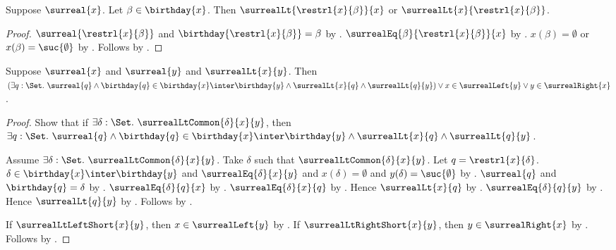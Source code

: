 \begin{theorem}\label{surreal_restriction_option}
    Suppose $\surreal{x}$.
    Let $\beta\in\birthday{x}$.
    Then $\surrealLt{\restrl{x}{\beta}}{x}$ or
        $\surrealLt{x}{\restrl{x}{\beta}}$.
\end{theorem}
\begin{proof}
    $\surreal{\restrl{x}{\beta}}$ and
        $\birthday{\restrl{x}{\beta}}=\beta$
        by .
    $\surrealEq{\beta}{\restrl{x}{\beta}}{x}$
        by .
    $x(\beta)=\emptyset$ or $x(\beta)=\suc{\emptyset}$
        by .
    Follows by
        .
\end{proof}

\begin{theorem}\label{surreal_lt_elimination}
    Suppose $\surreal{x}$ and $\surreal{y}$ and $\surrealLt{x}{y}$.
    Then $(\exists q:\Set.\ \surreal{q}\land
            \birthday{q}\in\birthday{x}\inter\birthday{y}\land
            \surrealLt{x}{q}\land\surrealLt{q}{y})
        \lor x\in\surrealLeft{y}
        \lor y\in\surrealRight{x}$.
\end{theorem}
\begin{proof}
    Show that if $\exists\delta:\Set.\ \surrealLtCommon{\delta}{x}{y}$, then
        $\exists q:\Set.\ \surreal{q}\land
            \birthday{q}\in\birthday{x}\inter\birthday{y}\land
            \surrealLt{x}{q}\land\surrealLt{q}{y}$.
    \begin{subproof}
        Assume $\exists\delta:\Set.\ \surrealLtCommon{\delta}{x}{y}$.
        Take $\delta$ such that $\surrealLtCommon{\delta}{x}{y}$.
        Let $q=\restrl{x}{\delta}$.
        $\delta\in\birthday{x}\inter\birthday{y}$ and
            $\surrealEq{\delta}{x}{y}$ and
            $x(\delta)=\emptyset$ and
            $y(\delta)=\suc{\emptyset}$
            by .
        $\surreal{q}$ and $\birthday{q}=\delta$
            by .
        $\surrealEq{\delta}{q}{x}$
            by .
        $\surrealEq{\delta}{x}{q}$
            by .
        Hence $\surrealLt{x}{q}$
            by .
        $\surrealEq{\delta}{q}{y}$
            by .
        Hence $\surrealLt{q}{y}$
            by .
        Follows by \auto.
    \end{subproof}
    If $\surrealLtLeftShort{x}{y}$, then
        $x\in\surrealLeft{y}$
        by .
    If $\surrealLtRightShort{x}{y}$, then
        $y\in\surrealRight{x}$
        by .
    Follows by .
\end{proof}
